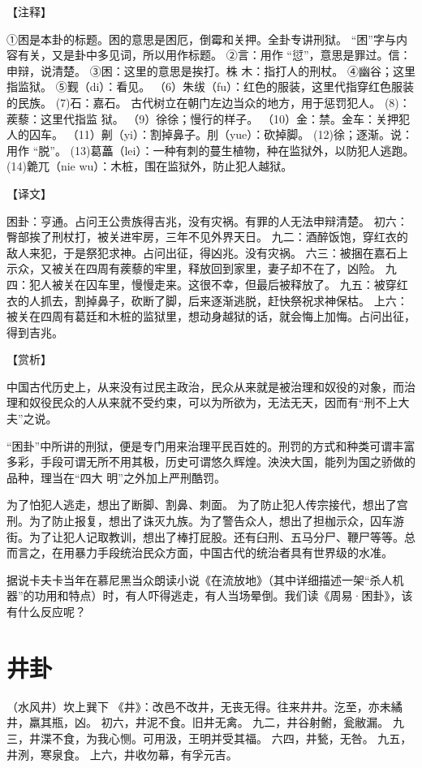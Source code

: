 \documentclass[12pt,UTF8]{ctexbook}
\begin{document}
【注释】

①困是本卦的标题。困的意思是困厄，倒霉和关押。全卦专讲刑狱。 “困”字与内容有关，又是卦中多见词，所以用作标题。
②言：用作 “愆”，意思是罪过。信：申辩，说清楚。
③困：这里的意思是挨打。株 木：指打人的刑杖。
④幽谷；这里指监狱。
⑤觐（di）：看见。
（6）朱绂（fu）：红色的服装，这里代指穿红色服装的民族。
(7)石：嘉石。 古代树立在朝门左边当众的地方，用于惩罚犯人。
(8)：蒺藜：这里代指监 狱。
（9）徐徐；慢行的样子。
（10）金：禁。金车：关押犯人的囚车。
（11）劓（yi）：割掉鼻子。刖（yue）：砍掉脚。
(12)徐；逐渐。说：用作 “脱”。
(13)葛藟（lei）：一种有刺的蔓生植物，种在监狱外，以防犯人逃跑。
(14)臲兀（nie wu）：木桩，围在监狱外，防止犯人越狱。

【译文】

困卦：亨通。占问王公贵族得吉兆，没有灾祸。有罪的人无法申辩清楚。
初六：臀部挨了刑杖打，被关进牢房，三年不见外界天日。
九二：酒醉饭饱，穿红衣的敌人来犯，于是祭犯求神。占问出征，得凶兆。没有灾祸。
六三：被捆在嘉石上示众，又被关在四周有蒺藜的牢里，释放回到家里，妻子却不在了，凶险。
九四：犯人被关在囚车里，慢慢走来。这很不幸，但最后被释放了。
九五：被穿红衣的人抓去，割掉鼻子，砍断了脚，后来逐渐逃脱，赶快祭祝求神保枯。
上六：被关在四周有葛廷和木桩的监狱里，想动身越狱的话，就会悔上加悔。占问出征，得到吉兆。

【赏析】

中国古代历史上，从来没有过民主政治，民众从来就是被治理和奴役的对象，而治理和奴役民众的人从来就不受约束，可以为所欲为，无法无天，因而有“刑不上大夫”之说。

“困卦”中所讲的刑狱，便是专门用来治理平民百姓的。刑罚的方式和种类可谓丰富多彩，手段可谓无所不用其极，历史可谓悠久辉煌。泱泱大国，能列为国之骄做的品种，理当在“四大 明”之外加上严刑酷罚。

为了怕犯人逃走，想出了断脚、割鼻、刺面。 为了防止犯人传宗接代，想出了宫刑。为了防止报复，想出了诛灭九族。为了警告众人，想出了担枷示众，囚车游街。为了让犯人记取教训，想出了棒打屁股。还有臼刑、五马分尸、鞭尸等等。总而言之，在用暴力手段统治民众方面，中国古代的统治者具有世界级的水准。

据说卡夫卡当年在慕尼黑当众朗读小说《在流放地》（其中详细描述一架“杀人机器”的功用和特点）时，有人吓得逃走，有人当场晕倒。我们读《周易·困卦》，该有什么反应呢？

\chapter{井卦}

（水风井）坎上巽下
《井》：改邑不改井，无丧无得。往来井井。汔至，亦未繘井，羸其瓶，凶。
初六，井泥不食。旧井无禽。
九二，井谷射鲋，瓮敝漏。
九三，井渫不食，为我心恻。可用汲，王明并受其福。
六四，井甃，无咎。
九五，井洌，寒泉食。
上六，井收勿幕，有孚元吉。
\end{document}
